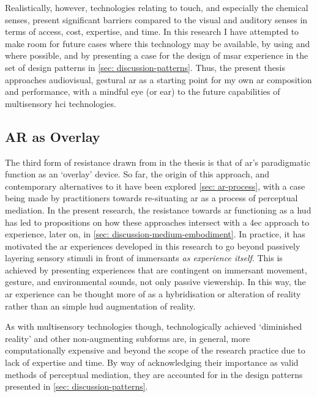 Realistically, however, technologies relating to touch, and especially the chemical senses, present significant barriers compared to the visual and auditory senses in terms of access, cost, expertise, and time. In this research I have attempted to make room for future cases where this technology may be available, by using   and  where possible, and by presenting a case for the design of \gls{msar} experience in the set of design patterns in \autoref{sec: discussion-patterns}. Thus, the present thesis approaches audiovisual, gestural \gls{ar} as a starting point for my own \gls{ar} composition and performance, with a mindful eye (or ear) to the future capabilities of multisensory \gls{hci} technologies.

\subsection{AR as Overlay}\label{sec: method-resistance-overlay}
The third form of resistance drawn from in the thesis is that of \gls{ar}'s paradigmatic function as an `overlay' device. So far, the origin of this approach, and contemporary alternatives to it have been explored \autoref{sec: ar-process}, with a case being made by practitioners \citep{mann1994,schraffenberger2018,chevalier2020} towards re-situating \gls{ar} as a process of perceptual mediation. In the present research, the resistance towards \gls{ar} functioning as a \gls{hud} has led to propositions on how these approaches intersect with a \gls{4ec} approach to experience, later on, in \autoref{sec: discussion-medium-embodiment}. In practice, it has motivated the \gls{ar} experiences developed in this research to go beyond passively layering sensory stimuli in front of immersants \textit{as experience itself}. This is achieved by presenting experiences that are contingent on immersant movement, gesture, and environmental sounds, not only passive viewership. In this way, the \gls{ar} experience can be thought more of as a hybridisation or alteration of reality rather than an simple \gls{hud} augmentation of reality.

As with multisensory technologies though, technologically achieved `diminished reality' and other non-augmenting subforms are, in general, more computationally expensive and beyond the scope of the research practice due to lack of expertise and time. By way of acknowledging their importance as valid methods of perceptual mediation, they are accounted for in the design patterns presented in \autoref{sec: discussion-patterns}.




